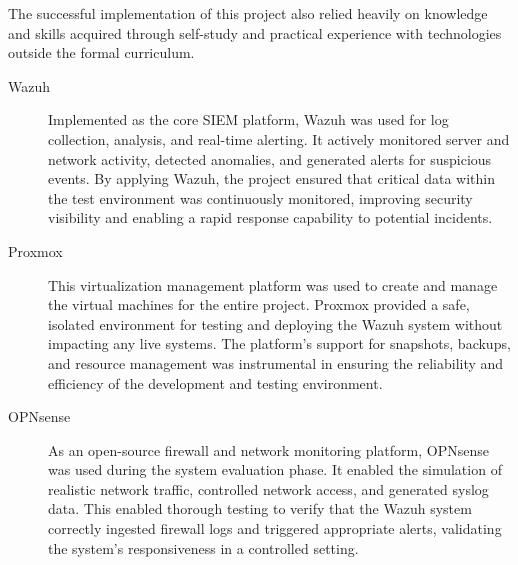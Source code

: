 \label{sec:extracurricular-knowledge}

The successful implementation of this project also relied heavily on knowledge and skills acquired through self-study and practical experience with technologies outside the formal curriculum.


\begin{description}
    \item[Wazuh] Implemented as the core SIEM platform, Wazuh was used for log collection, analysis, and real-time alerting. It actively monitored server and network activity, detected anomalies, and generated alerts for suspicious events. By applying Wazuh, the project ensured that critical data within the test environment was continuously monitored, improving security visibility and enabling a rapid response capability to potential incidents.

    \item[Proxmox] This virtualization management platform was used to create and manage the virtual machines for the entire project. Proxmox provided a safe, isolated environment for testing and deploying the Wazuh system without impacting any live systems. The platform's support for snapshots, backups, and resource management was instrumental in ensuring the reliability and efficiency of the development and testing environment.

    \item[OPNsense] As an open-source firewall and network monitoring platform, OPNsense was used during the system evaluation phase. It enabled the simulation of realistic network traffic, controlled network access, and generated syslog data. This enabled thorough testing to verify that the Wazuh system correctly ingested firewall logs and triggered appropriate alerts, validating the system’s responsiveness in a controlled setting.
\end{description}